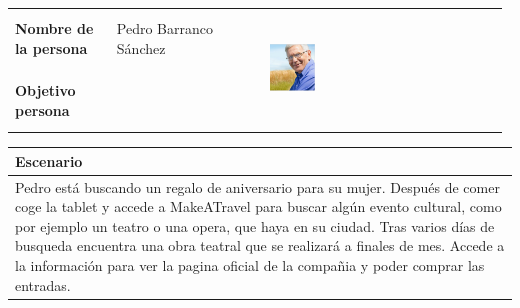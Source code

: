 \documentclass[11pt]{article}
\begin{document}
\begin{table}[H]
  \centering
  \begin{tabular}{p{0.2\linewidth}|p{0.3\linewidth}p{0.475\linewidth}}
    \toprule
    \textbf{Nombre de la persona} & Pedro Barranco Sánchez &\multirow{2}{*}{\begin{minipage}{1.\textwidth}\includegraphics[width=0.2\textwidth, height=30mm]{Pedro}\end{minipage}}\\
    \textbf{Objetivo persona} &  & \\
    \bottomrule
  \end{tabular}

\begin{tabular}{p{1.028\linewidth}}
  \textbf{Escenario}\\
  \midrule
  Pedro está buscando un regalo de aniversario para su mujer. Después de comer coge la tablet y accede a MakeATravel para buscar algún evento cultural, como por ejemplo un teatro o una opera, que haya en su ciudad. Tras varios días de busqueda encuentra una obra teatral que se realizará a finales de mes. Accede a la información para ver la pagina oficial de la compañia y poder comprar las entradas.

\end{tabular}
\end{table}
\end{document}
